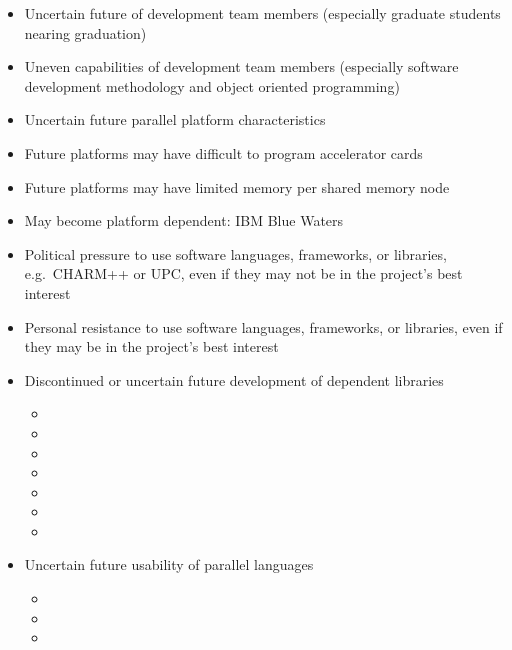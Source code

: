 \documentclass[11pt]{article}
\begin{document}
    \begin{itemize} 
%
    \item Uncertain future of development team members (especially
    graduate students nearing graduation)
%
    \item Uneven capabilities of development team members (especially
    software development methodology and object oriented programming)
%
    \item Uncertain future parallel platform characteristics
%
    \item Future platforms may have difficult to program accelerator cards
%
    \item Future platforms may have limited memory per shared memory node
%
    \item May become platform dependent: IBM Blue Waters
%
    \item Political pressure to use software languages, frameworks, or
    libraries, e.g.~CHARM++ or UPC, even if they may not be in the
    project's best interest
%
    \item Personal resistance to use software languages, frameworks,
    or libraries, even if they may be in the project's best interest
%
    \item Discontinued or uncertain future development of dependent libraries
%
    \begin{itemize}
        \item {}
        \item {}
        \item {}
        \item {}
        \item {}
        \item {}
        \item {}
    \end{itemize}
%
    \item Uncertain future usability of parallel languages
%
    \begin{itemize}
        \item {}
        \item {}
        \item {}
    \end{itemize}
%
\end{itemize}

   


\end{document}
